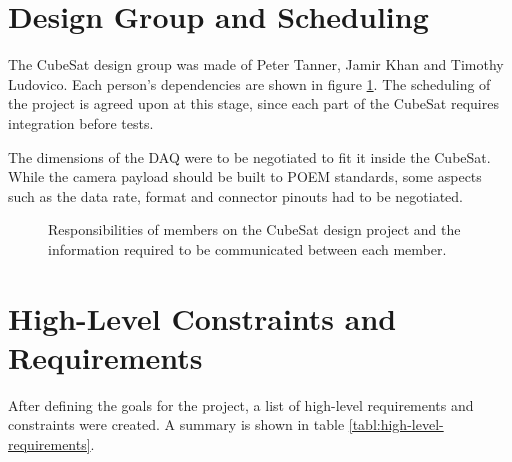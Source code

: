 \documentclass{report}
\begin{document}
\section{Design Group and Scheduling}

The CubeSat design group was made of Peter Tanner, Jamir Khan and Timothy Ludovico. Each person's dependencies are shown in figure \ref{fig:cubesat-responsibilities}. The scheduling of the project is agreed upon at this stage, since each part of the CubeSat requires integration before tests.

The dimensions of the DAQ were to be negotiated to fit it inside the CubeSat. While the camera payload should be built to POEM standards, some aspects such as the data rate, format and connector pinouts had to be negotiated.

\begin{figure}[H]
  \centering
  
  \caption{Responsibilities of members on the CubeSat design project and the information required to be communicated between each member.}
  \label{fig:cubesat-responsibilities}
\end{figure}

\section{High-Level Constraints and Requirements}

After defining the goals for the project, a list of high-level requirements and constraints were created. A summary is shown in table \ref{tabl:high-level-requirements}.
\end{document}

